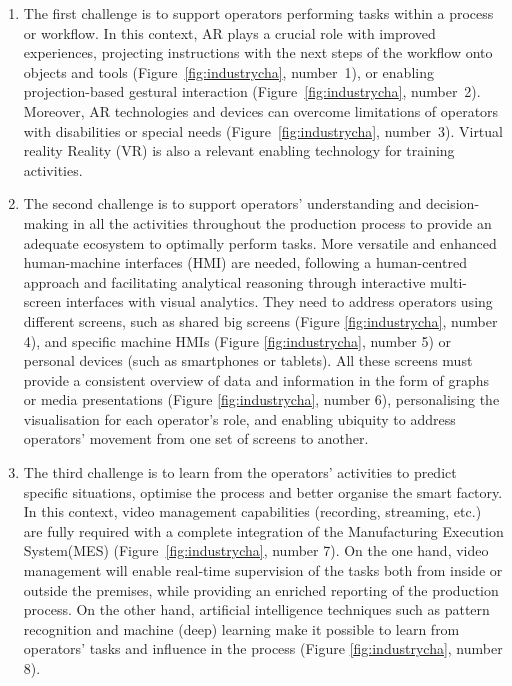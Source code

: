 \begin{enumerate}
\item The first challenge is to support operators performing tasks within a process or workflow. In this context, AR plays a crucial role with improved experiences, projecting instructions with the next steps of the workflow onto objects and tools (Figure~\ref{fig:industrycha}, number~1), or enabling projection-based gestural interaction (Figure~\ref{fig:industrycha}, number~2). Moreover, AR technologies and devices can overcome limitations of operators with disabilities or special needs (Figure~\ref{fig:industrycha}, number~3). Virtual reality Reality (VR) is also a relevant enabling technology for training activities.

\item The second challenge is to support operators’ understanding and decision-making in all the activities throughout the production process to provide an adequate ecosystem to optimally perform tasks. More versatile and enhanced human-machine interfaces (HMI) are needed, following a human-centred approach and facilitating analytical reasoning through interactive multi-screen interfaces with visual analytics. They need to address operators using different screens, such as shared big screens (Figure \ref{fig:industrycha}, number 4), and specific machine HMIs (Figure \ref{fig:industrycha}, number 5) or personal devices (such as smartphones or tablets). All these screens must provide a consistent overview of data and information in the form of graphs or media presentations (Figure \ref{fig:industrycha}, number 6), personalising the visualisation for each operator’s role, and enabling ubiquity to address operators’ movement from one set of screens to another.

\item The third challenge is to learn from the operators’ activities to predict specific situations, optimise the process and better organise the smart factory. In this context, video management capabilities (recording, streaming, etc.) are fully required with a complete integration of the Manufacturing Execution System(MES) (Figure~\ref{fig:industrycha}, number 7). On the one hand, video management will enable real-time supervision of the tasks both from inside or outside the premises, while providing an enriched reporting of the production process. On the other hand, artificial intelligence techniques such as pattern recognition and machine (deep) learning make it possible to learn from operators’ tasks and influence in the process (Figure \ref{fig:industrycha}, number 8). 

\end{enumerate}

